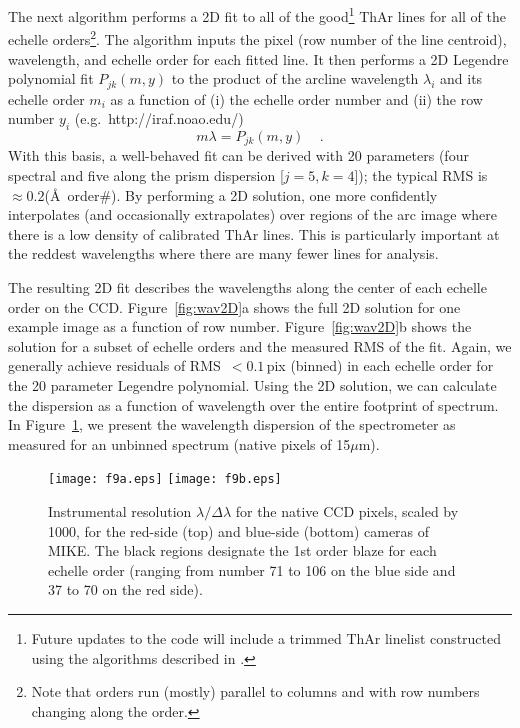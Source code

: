 \documentclass[]{emulateapj}
\begin{document}
The next algorithm performs a 2D fit to all of the good\footnote{Future
updates to the code will include a trimmed ThAr linelist
constructed using the algorithms described in \cite{murphy07}.}
ThAr lines for all of the echelle orders\footnote{Note 
that orders run (mostly) parallel to columns
and with row numbers changing along the order.}. 
The algorithm inputs the pixel (row
number of the line centroid), 
wavelength, and echelle order for each fitted line. 
It then performs a 2D Legendre
polynomial fit $P_{jk}(m,y)$
to the product of the arcline wavelength $\lambda_i$ and its
echelle order $m_i$ as a function of 
(i) the echelle order number and (ii)
the row number $y_i$ (e.g.\ http://iraf.noao.edu/)
\begin{equation}
m \lambda = P_{jk}(m, y) \;\;\;\; .
\end{equation}
With this basis, a well-behaved fit can be derived with 20 
parameters (four spectral and five along the prism dispersion [$j=5,k=4$]);
the typical RMS is $\approx 0.2$(\AA\ order\#).
By performing a 2D solution, one more confidently interpolates
(and occasionally extrapolates)
over regions of the arc image where there is a low density of 
calibrated ThAr lines.
This is particularly important at the reddest wavelengths
where there are many fewer lines for analysis. 

The resulting 2D fit describes the wavelengths along the 
center of each echelle order on the CCD.
Figure~\ref{fig:wav2D}a shows the full 2D solution for one example
image as a function of row number.
Figure~\ref{fig:wav2D}b shows the solution for a subset of 
echelle orders and the measured RMS of the fit.  Again, we
generally achieve residuals of RMS~$< 0.1$\,pix (binned) in each
echelle order for the 20 parameter Legendre polynomial.
Using the 2D solution, we can calculate the
dispersion as a function of wavelength over the entire footprint 
of spectrum. In Figure~\ref{fig:wavdisp}, we present the wavelength dispersion
of the spectrometer as measured for an unbinned spectrum
(native pixels of 15$\mu$m). 


\begin{figure}
\texttt{[image: f9a.eps]}
\texttt{[image: f9b.eps]}
\caption{Instrumental resolution $\lambda / \Delta \lambda$ for
the native CCD pixels, scaled by 1000, for the red-side (top) and 
blue-side (bottom) cameras of MIKE.  The black regions designate
the 1st order blaze for each echelle order (ranging from number 
71 to 106 on the blue side and 37 to 70 on the red side). }
\label{fig:wavdisp}
\end{figure}
\end{document}
